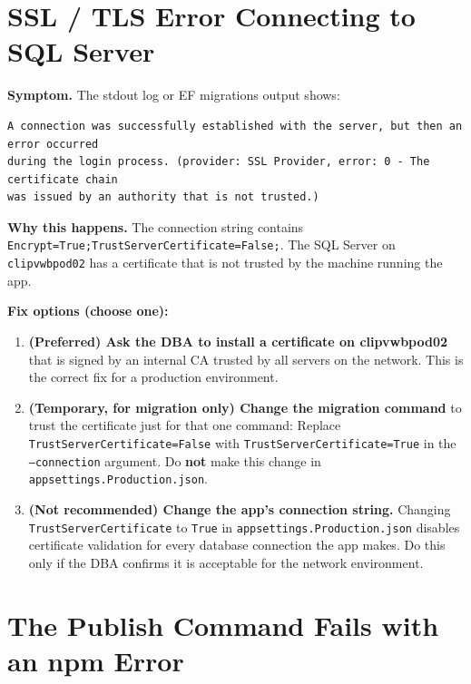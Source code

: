 \documentclass[a4paper,11pt]{article}
\begin{document}
\section{SSL / TLS Error Connecting to SQL Server}
\label{sec:sslerr}

\textbf{Symptom.}
The stdout log or EF migrations output shows:

\begin{lstlisting}
A connection was successfully established with the server, but then an error occurred
during the login process. (provider: SSL Provider, error: 0 - The certificate chain
was issued by an authority that is not trusted.)
\end{lstlisting}

\textbf{Why this happens.}
The connection string contains \texttt{Encrypt=True;TrustServerCertificate=False;}.
The SQL Server on \texttt{clipvwbpod02} has a certificate that is not trusted
by the machine running the app.

\textbf{Fix options (choose one):}

\begin{enumerate}
  \item \textbf{(Preferred) Ask the DBA to install a certificate on clipvwbpod02}
        that is signed by an internal CA trusted by all servers on the network.
        This is the correct fix for a production environment.
  \item \textbf{(Temporary, for migration only) Change the migration command}
        to trust the certificate just for that one command:
        Replace \texttt{TrustServerCertificate=False} with
        \texttt{TrustServerCertificate=True} in the \texttt{--connection} argument.
        Do \textbf{not} make this change in \texttt{appsettings.Production.json}.
  \item \textbf{(Not recommended) Change the app's connection string.}
        Changing \texttt{TrustServerCertificate} to \texttt{True} in
        \texttt{appsettings.Production.json} disables certificate validation for every
        database connection the app makes.
        Do this only if the DBA confirms it is acceptable for the network environment.
\end{enumerate}

\section{The Publish Command Fails with an npm Error}
\label{sec:npmfail}
\end{document}
